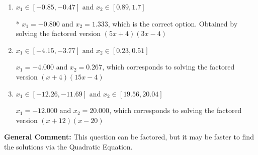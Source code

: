\documentclass{extbook}[14pt]
\begin{document}
\begin{enumerate}
{\begin{enumerate}[label=\Alph*.]
$x_1 = -1.600 \text{ and } x_2 = 0.667$, which corresponds to solving the factored version $(5x + 8)(3x -2)$
\item \( x_1 \in [-0.85, -0.47] \text{ and } x_2 \in [0.89, 1.7] \)

* $x_1 = -0.800 \text{ and } x_2 = 1.333$, which is the correct option. Obtained by solving the factored version $(5x + 4)(3x -4)$
\item \( x_1 \in [-4.15, -3.77] \text{ and } x_2 \in [0.23, 0.51] \)

$x_1 = -4.000 \text{ and } x_2 = 0.267$, which corresponds to solving the factored version $(x + 4)(15x -4)$
\item \( x_1 \in [-12.26, -11.69] \text{ and } x_2 \in [19.56, 20.04] \)

$x_1 = -12.000 \text{ and } x_2 = 20.000$, which corresponds to solving the factored version $(x + 12)(x -20)$
\end{enumerate}

\textbf{General Comment:} This question can be factored, but it may be faster to find the solutions via the Quadratic Equation.
}
\end{enumerate}
\end{document}
